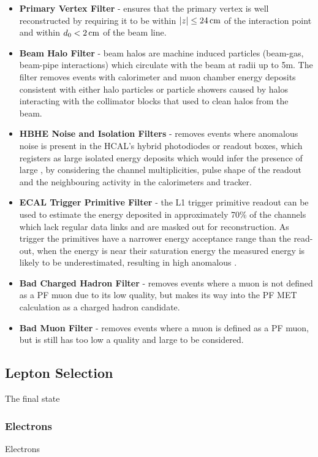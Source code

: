 \begin{itemize}
\item \textbf{Primary Vertex Filter} - ensures that the primary vertex is well reconstructed by requiring it to be within $|z| \leq 24\,\text{cm}$ of the interaction point and within $d_{0} < 2\,\text{cm}$ of the beam line.
\item \textbf{Beam Halo Filter} - beam halos are machine induced particles (\eg beam-gas, beam-pipe interactions) which circulate with the beam at radii up to 5m. The filter removes events with calorimeter and muon chamber energy deposits consistent with either halo particles or particle showers caused by halos interacting with the collimator blocks that used to clean halos from the beam.
\item \textbf{HBHE Noise and Isolation Filters} - removes events where anomalous noise is present in the HCAL's hybrid photodiodes or readout boxes, which registers as large isolated energy deposits which would infer the presence of large \MET, by considering the channel multiplicities, pulse shape of the readout and the neighbouring activity in the calorimeters and tracker.
\item \textbf{ECAL Trigger Primitive Filter} - the L1 trigger primitive readout can be used to estimate the energy deposited in approximately 70\% of the channels which lack regular data links and are masked out for reconstruction. As trigger the primitives have a narrower energy acceptance range than the read-out, when the energy is near their saturation energy the measured energy is likely to be underestimated, resulting in high anomalous \MET. 
\item \textbf{Bad Charged Hadron Filter} - removes events where a muon is not defined as a PF muon due to its low quality, but makes its way into the PF MET calculation as a charged hadron candidate.
\item \textbf{Bad Muon Filter} - removes events where a muon is defined as a PF muon, but is still has too low a quality and large \pT to be considered.
\end{itemize}

\subsection{Lepton Selection}
The final state 
\subsubsection{Electrons}
Electrons
